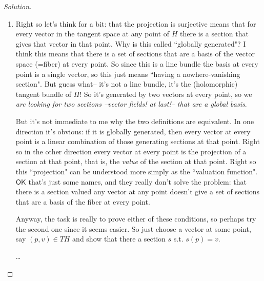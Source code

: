 \begin{proof}[Solution]\leavevmode
\begin{enumerate}[label=(\alph*)]
\item Right so let's think for a bit: that the projection is surjective means that for every vector in the tangent space at any point of \(H\) there is a section that gives that vector in that point. {\color{6}Why is this called ``globally generated"? I think this means that there is a set of sections that are a basis of the vector space (=fiber) at every point. So since this is a line bundle the basis at every point is a single vector, so this just means ``having a nowhere-vanishing section"}. But guess what-- it's not a line bundle, it's the (holomorphic) tangent bundle of \(H\)! So it's generated by two vectors at every point, so we \textit{are looking for two sections --vector fields! at last!-- that are a global basis}.

	But it's not immediate to me why the two definitions are equivalent. In one direction it's obvious: if it is globally generated, then every vector at every point is a linear combination of those generating sections at that point. Right so in the other direction every vector at every point is the projection of a section at that point, that is, the \textit{value} of the section at that point. Right so this ``projection" can be understood more simply as the ``valuation function". $\mathsf{OK}$ that's just some names, and they really don't solve the problem: that there is a section valued any vector at any point doesn't give a set of sections that are a basis of the fiber at every point.

Anyway, the task is really to prove either of these conditions, so perhaps try the second one since it seems easier. So just choose a vector at some point, say \((p,v) \in TH\) and show that there a section \(s\) s.t. \(s(p)=v\).

{\color{2}…}
\end{enumerate}
\end{proof}



